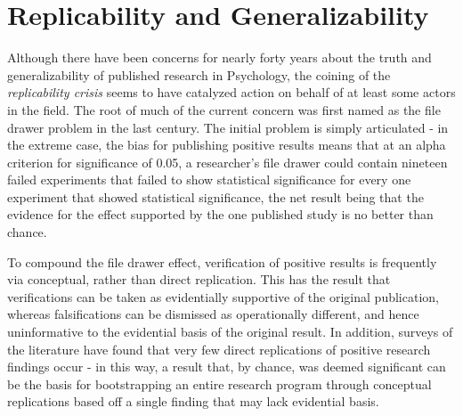 \documentclass[12pt,a4paper,titlepage]{scrreprt}
\begin{document}
\section{Replicability and Generalizability}
Although there have been concerns for nearly forty years\cite{greenwald_consequences_1975} about the truth and generalizability of published research in Psychology, the coining of the \textit{replicability crisis}\cite{pashler_editors_2012} seems to have catalyzed action on behalf of at least some actors in the field. The root of much of the current concern was first named as the file drawer problem in the last century\cite{rosenthal_file_1979}. The initial problem is simply articulated - in the extreme case, the bias for publishing positive results means that at an alpha criterion for significance of 0.05, a researcher's file drawer could contain nineteen failed experiments that failed to show statistical significance for every one experiment that showed statistical significance, the net result being that the evidence for the effect supported by the one published study is no better than chance.

To compound the file drawer effect, verification of positive results is frequently via conceptual, rather than direct replication\cite{pashler_is_2012}. This has the result that verifications can be taken as evidentially supportive of the original publication, whereas falsifications can be dismissed as operationally different, and hence uninformative to the evidential basis of the original result. In addition, surveys of the literature have found that very few direct replications of positive research findings occur\cite{makel_replications_2012} - in this way, a result that, by chance, was deemed significant can be the basis for bootstrapping an entire research program through conceptual replications based off a single finding that may lack evidential basis.
\end{document}
